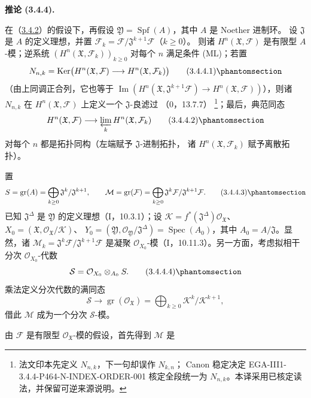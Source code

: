 \documentclass[UTF8,fontset=none,11pt,oneside,openany]{ctexbook}
\newcommand{\SourceCorrectionNote}[1]{\footnote{#1}}
\newenvironment{corollary}[1][]{%
  \par\medskip\noindent\textbf{推论 (#1).}\ %
}{\par}
\let\EGAOriginalLabel\label
\renewcommand{\label}[1]{\phantomsection\EGAOriginalLabel{#1}}
\begin{document}
\begin{corollary}[3.4.4]
\label{III.3.4.4-fr}
在（\hyperref[III.3.4.2-fr]{3.4.2}）的假设下，再假设
$\mathfrak Y=\operatorname{Spf}(A)$，其中 $A$ 是 Noether 进制环。
设 $\mathfrak J$ 是 $A$ 的定义理想，并置
$\mathcal F_k=\mathcal F/\mathfrak J^{k+1}\mathcal F$（$k\geq0$）。
则诸 $H^n(\mathfrak X,\mathcal F)$ 是有限型 $A$-模；逆系统
$(H^n(\mathfrak X,\mathcal F_k))_{k\geq0}$ 对每个 $n$ 满足条件 (ML)；若置
\[
N_{n,k}=\operatorname{Ker}\bigl(H^n(\mathfrak X,\mathcal F)
\longrightarrow H^n(\mathfrak X,\mathcal F_k)\bigr)
\tag{3.4.4.1}\label{III.3.4.4.1-fr}
\]
（由上同调正合列，它也等于
$\operatorname{Im}(H^n(\mathfrak X,\mathfrak J^{k+1}\mathcal F)
\to H^n(\mathfrak X,\mathcal F))$），则诸 $N_{n,k}$ 在
$H^n(\mathfrak X,\mathcal F)$ 上定义一个 $\mathfrak J$-良滤过
（0，13.7.7）
\SourceCorrectionNote{法文印本先定义 $N_{n,k}$，下一句却误作 $N_{k,n}$；
Canon 稳定决定 EGA-III1-3.4.4-P464-N-INDEX-ORDER-001 核定全段统一为
$N_{n,k}$。本译采用已核定读法，并保留可逆来源说明。}；最后，典范同态
\[
H^n(\mathfrak X,\mathcal F)
\longrightarrow\varprojlim_kH^n(\mathfrak X,\mathcal F_k)
\tag{3.4.4.2}\label{III.3.4.4.2-fr}
\]
对每个 $n$ 都是拓扑同构（左端赋予 $\mathfrak J$-进制拓扑，
诸 $H^n(\mathfrak X,\mathcal F_k)$ 赋予离散拓扑）。
\end{corollary}

置
\[
S=\operatorname{gr}(A)=\bigoplus_{k\geq0}
\mathfrak J^k/\mathfrak J^{k+1},\qquad
\mathcal M=\operatorname{gr}(\mathcal F)=\bigoplus_{k\geq0}
\mathfrak J^k\mathcal F/\mathfrak J^{k+1}\mathcal F.
\tag{3.4.4.3}\label{III.3.4.4.3-fr}
\]
已知 $\mathfrak J^\Delta$ 是 $\mathfrak Y$ 的定义理想（I，10.3.1）；设
$\mathcal K=f^*(\mathfrak J^\Delta)\mathcal O_{\mathfrak X}$、
$X_0=(\mathfrak X,\mathcal O_{\mathfrak X}/\mathcal K)$、
$Y_0=(\mathfrak Y,\mathcal O_{\mathfrak Y}/\mathfrak J^\Delta)
=\operatorname{Spec}(A_0)$，其中 $A_0=A/\mathfrak J$。显然，诸
$\mathcal M_k=\mathfrak J^k\mathcal F/\mathfrak J^{k+1}\mathcal F$
是凝聚 $\mathcal O_{X_0}$-模（I，10.11.3）。另一方面，考虑拟相干分次
$\mathcal O_{X_0}$-代数
\[
\mathcal S=\mathcal O_{X_0}\otimes_{A_0}S.
\tag{3.4.4.4}\label{III.3.4.4.4-fr}
\]
乘法定义分次代数的满同态
\[
\mathcal S\longrightarrow
\operatorname{gr}(\mathcal O_{\mathfrak X})
=\bigoplus_{k\geq0}\mathcal K^k/\mathcal K^{k+1},
\]
借此 $\mathcal M$ 成为一个分次 $\mathcal S$-模。

由 $\mathcal F$ 是有限型 $\mathcal O_{\mathfrak X}$-模的假设，首先得到
$\mathcal M$ 是
\end{document}
